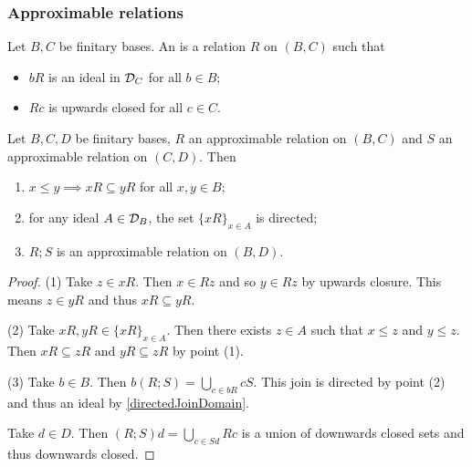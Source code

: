 \subsubsection{Approximable relations}
\begin{definition}
Let $B,C$ be finitary bases. An  is a relation $R$ on $(B,C)$ such that
\begin{itemize}
\item $bR$ is an ideal in $\mathcal{D}_C$ for all $b\in B$;
\item $Rc$ is upwards closed for all $c\in C$.
\end{itemize}
\end{definition}

\begin{lemma} \label{approximableRelationLemma}
Let $B,C,D$ be finitary bases, $R$ an approximable relation on $(B,C)$ and $S$ an approximable relation on $(C,D)$. Then
\begin{enumerate}
\item $x\leq y \implies xR \subseteq yR$ for all $x,y\in B$;
\item for any ideal $A\in\mathcal{D}_B$, the set $\{xR\}_{x\in A}$ is directed;
\item $R;S$ is an approximable relation on $(B,D)$.
\end{enumerate}
\end{lemma}
\begin{proof}
(1) Take $z\in xR$. Then $x\in Rz$ and so $y\in Rz$ by upwards closure. This means $z\in yR$ and thus $xR \subseteq yR$.

(2) Take $xR, yR \in \{xR\}_{x\in A}$. Then there exists $z\in A$ such that $x\leq z$ and $y\leq z$. Then $xR\subseteq zR$ and $yR \subseteq zR$ by point (1).

(3) Take $b\in B$. Then $b(R;S) = \bigcup _{c\in bR}cS$. This join is directed by point (2) and thus an ideal by \ref{directedJoinDomain}.

Take $d\in D$. Then $(R;S)d = \bigcup_{c\in Sd}Rc$ is a union of downwards closed sets and thus downwards closed.
\end{proof}

